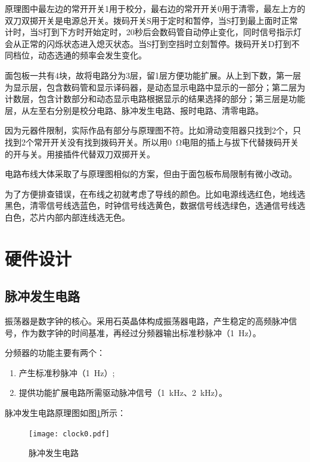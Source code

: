 \documentclass{article}
\newcounter{sub}
\begin{document}
原理图中最左边的常开开关1用于校分，最右边的常开开关0用于清零，最左上方的双刀双掷开关是电源总开关。拨码开关S用于定时和暂停，当S打到最上面时正常计时，当S打到下方时开始定时，20秒后会数码管自动停止变化，同时信号指示灯会从正常的闪烁状态进入熄灭状态。当S打到空挡时立刻暂停。拨码开关D打到不同档位，动态选通的频率会发生变化。

面包板一共有4块，故将电路分为3层，留1层方便功能扩展。从上到下数，第一层为显示层，包含数码管和显示译码器，是动态显示电路中显示的一部分；第二层为计数层，包含计数部分和动态显示电路根据显示的结果选择的部分；第三层是功能层，从左至右分别是校分电路、脉冲发生电路、报时电路、清零电路。

因为元器件限制，实际作品有部分与原理图不符。比如滑动变阻器只找到2个，只找到2个常开开关没有找到拨码开关。所以用\SI{0}{\ohm}电阻的插上与拔下代替拨码开关的开与关。用接插件代替双刀双掷开关。

电路布线大体采取了与原理图相似的方案，但由于面包板布局限制有微小改动。

为了方便排查错误，在布线之初就考虑了导线的颜色。比如电源线选红色，地线选黑色，清零信号线选蓝色，时钟信号线选黄色，数据信号线选绿色，选通信号线选白色，芯片内部内部连线选无色。

\section{硬件设计}%
\label{sec:硬件设计}

\subsection{脉冲发生电路}%
\label{sub:脉冲发生电路}

振荡器是数字钟的核心。采用石英晶体构成振荡器电路，产生稳定的高频脉冲信号，作为数字钟的时间基准，再经过分频器输出标准秒脉冲（\SI{1}{Hz}）。

分频器的功能主要有两个：

\begin{enumerate}
	\item 产生标准秒脉冲（\SI{1}{Hz}）;
	\item 提供功能扩展电路所需驱动脉冲信号（\SI{1}{kHz}、\SI{2}{kHz}）。
\end{enumerate}

脉冲发生电路原理图如图\ref{fig:脉冲发生电路}所示：

\begin{figure}[htpb]
	\centering
	\texttt{[image: clock0.pdf]}
	\caption{脉冲发生电路}
	\label{fig:脉冲发生电路}
\end{figure}
\end{document}
